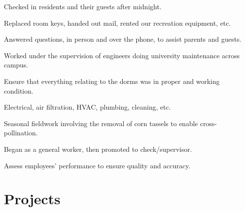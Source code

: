 \documentclass[]{latex/resume}
\begin{document}
\begin{minipage}[t]{0.75\textwidth}
    \sectionsep

     
    \begin{tightemize}
        \sectionsep
            \item Checked in residents and their guests after midnight.
            \item Replaced room keys, handed out mail, rented our recreation equipment, etc.
            \item Answered questions, in person and over the phone, to assist parents and guests.
        \end{tightemize}

    \sectionsep

         
        \begin{tightemize}
            \sectionsep
                \item Worked under the supervision of engineers doing university maintenance across campus.
                \item Ensure that everything relating to the dorms was in proper and working condition.
                \item Electrical, air filtration, HVAC, plumbing, cleaning, etc.
            \end{tightemize}
            
    \sectionsep

     
    \begin{tightemize}
        \sectionsep
            \item Seasonal fieldwork involving the removal of corn tassels to enable cross-pollination.
            \item Began as a general worker, then promoted to check/supervisor.
            \item Assess employees' performance to ensure quality and accuracy.
    \end{tightemize}
    



\section{Projects}


\end{minipage}
\end{document}
